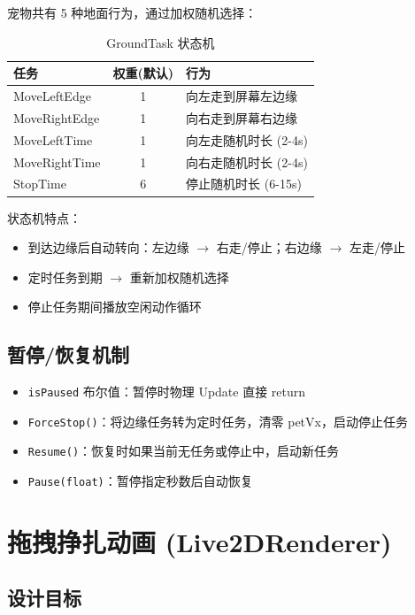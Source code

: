 \documentclass[12pt,a4paper]{ctexart}
\begin{document}
宠物共有 5 种地面行为，通过加权随机选择：

\begin{table}[H]
\centering
\caption{GroundTask 状态机}
\label{tab:tasks}
\begin{tabular}{lcl}
\toprule
\textbf{任务} & \textbf{权重(默认)} & \textbf{行为} \\
\midrule
MoveLeftEdge  & 1   & 向左走到屏幕左边缘 \\
MoveRightEdge & 1   & 向右走到屏幕右边缘 \\
MoveLeftTime  & 1   & 向左走随机时长 (2-4s) \\
MoveRightTime & 1   & 向右走随机时长 (2-4s) \\
StopTime      & 6   & 停止随机时长 (6-15s) \\
\bottomrule
\end{tabular}
\end{table}

状态机特点：
\begin{itemize}
    \item 到达边缘后自动转向：左边缘 $\to$ 右走/停止；右边缘 $\to$ 左走/停止
    \item 定时任务到期 $\to$ 重新加权随机选择
    \item 停止任务期间播放空闲动作循环
\end{itemize}

\subsection{暂停/恢复机制}

\begin{itemize}
    \item \texttt{isPaused} 布尔值：暂停时物理 Update 直接 return
    \item \texttt{ForceStop()}：将边缘任务转为定时任务，清零 petVx，启动停止任务
    \item \texttt{Resume()}：恢复时如果当前无任务或停止中，启动新任务
    \item \texttt{Pause(float)}：暂停指定秒数后自动恢复
\end{itemize}

\section{拖拽挣扎动画 (Live2DRenderer)}

\subsection{设计目标}
\end{document}
